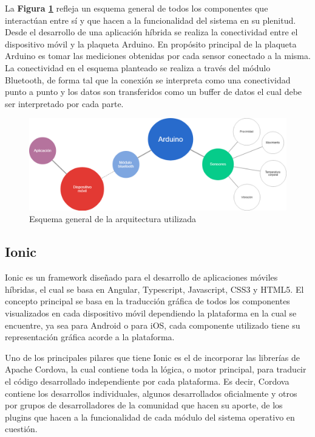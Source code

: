 \documentclass{IEEEtran}
\begin{document}
			La \textbf{Figura \ref{esquemageneral}} refleja un esquema general de todos los componentes que interactúan entre sí y que hacen a la funcionalidad del sistema en su plenitud. Desde el desarrollo de una aplicación híbrida se realiza la conectividad entre el dispositivo móvil y la plaqueta Arduino. En propósito principal de la plaqueta Arduino es tomar las mediciones obtenidas por cada sensor conectado a la misma. La conectividad en el esquema planteado se realiza a través del módulo Bluetooth, de forma tal que la conexión se interpreta como una conectividad punto a punto y los datos son transferidos como un buffer de datos el cual debe ser interpretado por cada parte.

			\begin{figure}
				\centering
				\includegraphics[width=1\linewidth]{esquemageneral}
				\caption{Esquema general de la arquitectura utilizada}
				\label{esquemageneral}
			\end{figure}

		\subsection{Ionic}

			Ionic es un framework diseñado para el desarrollo de aplicaciones móviles híbridas, el cual se basa en Angular, Typescript, Javascript, CSS3 y HTML5. El concepto principal se basa en la traducción gráfica de todos los componentes visualizados en cada dispositivo móvil dependiendo la plataforma en la cual se encuentre, ya sea para Android o para iOS, cada componente utilizado tiene su representación gráfica acorde a la plataforma.

			Uno de los principales pilares que tiene Ionic es el de incorporar las librerías de Apache Cordova, la cual contiene toda la lógica, o motor principal, para traducir el código desarrollado independiente por cada plataforma. Es decir, Cordova contiene los desarrollos individuales, algunos desarrollados oficialmente y otros por grupos de desarrolladores de la comunidad que hacen su aporte, de los plugins que hacen a la funcionalidad de cada módulo del sistema operativo en cuestión.
\end{document}
